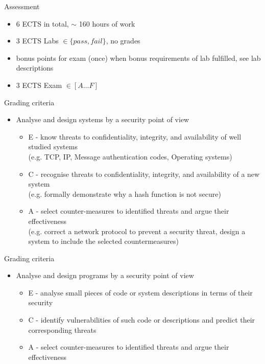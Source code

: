 \documentclass{beamer}
\begin{document}
\begin{frame}{Assessment}
  \begin{itemize}
  \item 6 ECTS in total, $\sim$ 160 hours of work 
  \item 3 ECTS Labs $\in \{pass,fail\}$, no grades
  \item bonus points for exam (once) when bonus 
    requirements of lab fulfilled, see lab descriptions
  \item 3 ECTS Exam $\in [A \dots F]$
  \end{itemize}
\end{frame}

\begin{frame}{Grading criteria}
  \begin{itemize}
  \item Analyse and design systems by a security point of view
    \begin{itemize}
    \item E - know threats to confidentiality, integrity,
      and availability of well studied systems\\
      (e.g. TCP, IP, Message authentication codes, Operating systems)
    \item C - recognise threats to confidentiality, integrity, and
      availability of a new system\\ (e.g. formally demonstrate why a
      hash function is not secure)
    \item A - select counter-measures to identified threats and argue
      their effectiveness\\
      (e.g. correct a network protocol to prevent a security threat,
      design a system to include the selected countermeasures)
    \end{itemize}
  \end{itemize}
\end{frame}

\begin{frame}{Grading criteria}
  \begin{itemize}
  \item Analyse and design programs by a security point of view
    \begin{itemize}
    \item E - analyse small pieces of code or system descriptions in
      terms of their security
    \item C - identify vulnerabilities of such code or descriptions
      and predict their corresponding threats
    \item A - select counter-measures to identified threats and argue
      their effectiveness
    \end{itemize}
  \end{itemize}
\end{frame}
\end{document}
